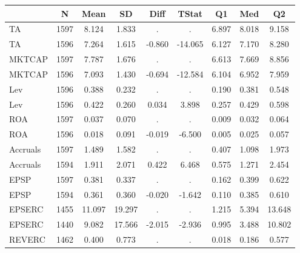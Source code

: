 \begin{tabular}{l*{8}{c}}
\toprule
            &           N&        Mean&          SD&        Diff&       TStat&          Q1&         Med&          Q2\\
\midrule
TA          &        1597&       8.124&       1.833&           .&           .&       6.897&       8.018&       9.158\\
TA          &        1596&       7.264&       1.615&      -0.860&     -14.065&       6.127&       7.170&       8.280\\
MKTCAP      &        1597&       7.787&       1.676&           .&           .&       6.613&       7.669&       8.856\\
MKTCAP      &        1596&       7.093&       1.430&      -0.694&     -12.584&       6.104&       6.952&       7.959\\
Lev         &        1596&       0.388&       0.232&           .&           .&       0.190&       0.381&       0.548\\
Lev         &        1596&       0.422&       0.260&       0.034&       3.898&       0.257&       0.429&       0.598\\
ROA         &        1597&       0.037&       0.070&           .&           .&       0.009&       0.032&       0.064\\
ROA         &        1596&       0.018&       0.091&      -0.019&      -6.500&       0.005&       0.025&       0.057\\
Accruals    &        1597&       1.489&       1.582&           .&           .&       0.407&       1.098&       1.973\\
Accruals    &        1594&       1.911&       2.071&       0.422&       6.468&       0.575&       1.271&       2.454\\
EPSP        &        1597&       0.381&       0.337&           .&           .&       0.162&       0.399&       0.622\\
EPSP        &        1594&       0.361&       0.360&      -0.020&      -1.642&       0.110&       0.385&       0.610\\
EPSERC      &        1455&      11.097&      19.297&           .&           .&       1.215&       5.394&      13.648\\
EPSERC      &        1440&       9.082&      17.566&      -2.015&      -2.936&       0.995&       3.488&      10.802\\
REVERC      &        1462&       0.400&       0.773&           .&           .&       0.018&       0.186&       0.577\\

\end{tabular}
